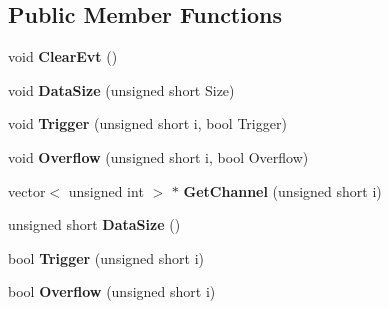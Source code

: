 \subsection*{Public Member Functions}
\begin{DoxyCompactItemize}
\item 
\hypertarget{class_bragg_chamber_sub_event_a361384c90ff3a09bc91f1cc644c80e58}{void {\bfseries Clear\-Evt} ()}\label{class_bragg_chamber_sub_event_a361384c90ff3a09bc91f1cc644c80e58}

\item 
\hypertarget{class_bragg_chamber_sub_event_a04c65ccc330d71355f8b642eabf6c464}{void {\bfseries Data\-Size} (unsigned short Size)}\label{class_bragg_chamber_sub_event_a04c65ccc330d71355f8b642eabf6c464}

\item 
\hypertarget{class_bragg_chamber_sub_event_af6d6ac1acdea729f2feefad5f897ff43}{void {\bfseries Trigger} (unsigned short i, bool Trigger)}\label{class_bragg_chamber_sub_event_af6d6ac1acdea729f2feefad5f897ff43}

\item 
\hypertarget{class_bragg_chamber_sub_event_af67259ec99fc0a94706d61411567a5c9}{void {\bfseries Overflow} (unsigned short i, bool Overflow)}\label{class_bragg_chamber_sub_event_af67259ec99fc0a94706d61411567a5c9}

\item 
\hypertarget{class_bragg_chamber_sub_event_ad6b036298bc77c069005948cebd4df7e}{vector$<$ unsigned int $>$ $\ast$ {\bfseries Get\-Channel} (unsigned short i)}\label{class_bragg_chamber_sub_event_ad6b036298bc77c069005948cebd4df7e}

\item 
\hypertarget{class_bragg_chamber_sub_event_a0d98bf1a80709bcf8d36c479b9548ebd}{unsigned short {\bfseries Data\-Size} ()}\label{class_bragg_chamber_sub_event_a0d98bf1a80709bcf8d36c479b9548ebd}

\item 
\hypertarget{class_bragg_chamber_sub_event_a2723e90238f9d3545f40d305621d7ec7}{bool {\bfseries Trigger} (unsigned short i)}\label{class_bragg_chamber_sub_event_a2723e90238f9d3545f40d305621d7ec7}

\item 
\hypertarget{class_bragg_chamber_sub_event_adca2567c05cb94ed4336ac0516d5e63a}{bool {\bfseries Overflow} (unsigned short i)}\label{class_bragg_chamber_sub_event_adca2567c05cb94ed4336ac0516d5e63a}

\end{DoxyCompactItemize}
